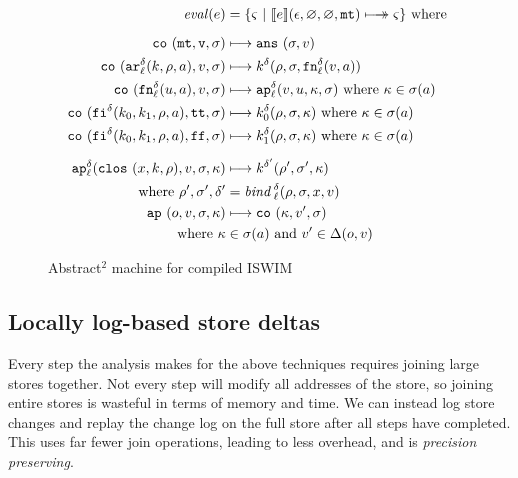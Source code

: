 \documentclass[preprint,onecolumn,9pt]{sigplanconf} %
\begin{document}
\begin{figure}
\begin{align*}
\mathit{eval}(\mexp) &= \{ \mstate\ |\ \compile{\mexp}(\epsilon,\varnothing,\varnothing,\kmt) \multimachstep \mstate \} \text{ where }
\\[2mm]
\co{\kmt,\mval,\msto} &\machstep
\ans{\msto,\mval}
\\
\co{\kar[^\mcntr_\mlab]{\mcomp,\menv,\maddr},\mval,\msto} & \machstep
\mcomp^\mcntr(\menv,\msto,\kfn[^\mcntr_\mlab]{\mval,\maddr})
\\
\co{\kfn[^\mcntr_\mlab]{{\mvalx{u}},\maddr},\mval,\msto} & \machstep
\ap[^\mcntr_\mlab]{\mval,\mvalx{u},\mkont,\msto}
\text{ where }\mkont \in \msto(\maddr)
\\
\co{\kif[^\mcntr]{\mcompi0,\mcompi1,\menv,\maddr},\strue,\msto} & \machstep
\mcompi0^\mcntr(\menv,\msto,\mkont)
\text{ where }\mkont\in\msto(\maddr)
\\
\co{\kif[^\mcntr]{\mcompi0,\mcompi1,\menv,\maddr},\sfalse,\msto} & \machstep
\mcompi1^\mcntr(\menv,\msto,\mkont)
\text{ where }\mkont\in\msto(\maddr)
\\[2mm]
\ap[^\mcntr_\mlab]{\clos{\mvar,\mcomp,\menv},\mval,\msto,\mkont} & \machstep
\mcomp^{\mcntr'}(\menv',\msto',\mkont) \\
\text{ where }\menv',\msto',\mcntr' &= \mathit{bind\,}^{ \mcntr}_\mlab(\menv,\msto,\mvar,\mval)
\\
\ap{\mop,\mval,\msto,\mkont} & \machstep
\co{\mkont,\mval',\msto} \\
\text{ where }\mkont &\in\msto(\maddr)
\text{ and } \mval'\in\interpdelta(\mop,\mval)
\end{align*}
\caption{Abstract$^2$ machine for compiled ISWIM}
\label{fig:caam}
\end{figure}




\subsection{Locally log-based store deltas}

Every step the analysis makes for the above techniques requires
joining large stores together. Not every step will modify all
addresses of the store, so joining entire stores is wasteful in terms
of memory and time. We can instead log store changes and replay the
change log on the full store after all steps have completed. This uses
far fewer join operations, leading to less overhead, and is \emph{precision preserving}.
\end{document}
